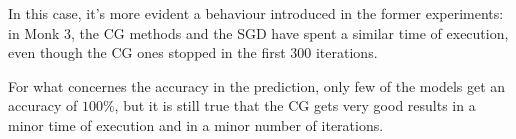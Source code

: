            In this case, it's more evident a behaviour introduced in the former experiments: in Monk 3, the CG methods and the SGD have spent a similar time of execution, even though the CG ones stopped in the first 300 iterations. 

            For what concernes the accuracy in the prediction, only few of the models get an accuracy of $100\%$, but it is still true that the CG gets very good results in a minor time of execution and in a minor number of iterations.

            \begin{figure}[t!]
                \centering
                \begin{subfigure}{0.45\textwidth}
                    \caption{}
                    \label{fig:monks_1_MSE_all_max_iterations_t}
                \end{subfigure}
                \begin{subfigure}{0.45\textwidth}
\end{subfigure}
\end{figure}
